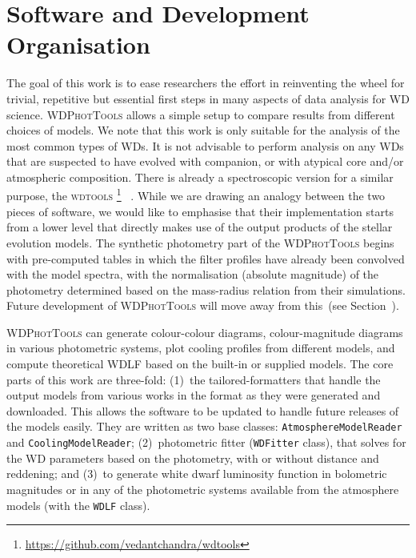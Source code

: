 \documentclass[fleqn,usenatbib]{rasti}
\begin{document}
\section{Software and Development Organisation}
The goal of this work is to ease researchers the effort in reinventing the
wheel for trivial, repetitive but essential first steps in many
aspects of data analysis for WD science. \textsc{WDPhotTools} allows a simple
setup to compare results from different choices of models. We note that this work is only suitable for the analysis of the
most common types of WDs. It is not advisable to perform analysis on any WDs
that are suspected to have evolved with companion, or with atypical core
and/or atmospheric composition.
There is already a spectroscopic version for a similar purpose, the
\textsc{wdtools} \footnote{\url{https://github.com/vedantchandra/wdtools}}~
\citep{2020MNRAS.497.2688C}. While we are drawing
an analogy between the two pieces of software, we would like to emphasise that their
implementation starts from a lower level that directly makes use of the
output products of the stellar evolution models. The synthetic
photometry part of the \textsc{WDPhotTools} begins with pre-computed
tables in which the filter profiles have already been convolved with the model
spectra, with the normalisation (absolute magnitude) of the photometry
determined based on the mass-radius relation from their simulations. Future
development of \textsc{WDPhotTools} will move away from this~(see
Section~).

\textsc{WDPhotTools} can generate colour-colour diagrams,
colour-magnitude diagrams in various photometric systems,
plot cooling profiles from different models, and compute
theoretical WDLF based on the built-in or supplied models.
The core parts of this work are three-fold: (1)~the tailored-formatters that
handle the output models from various works in the format as they were
generated and downloaded. This allows the software to be updated to handle
future releases of the models easily. They are written as
two base classes: \texttt{AtmosphereModelReader} and
\texttt{CoolingModelReader}; (2)~photometric fitter
(\texttt{WDFitter} class), that solves for
the WD parameters based on the photometry, with or without distance and
reddening; and (3)~to generate white dwarf luminosity function in
bolometric magnitudes or in any of the photometric systems available from the
atmosphere models (with the \texttt{WDLF} class).
\end{document}
